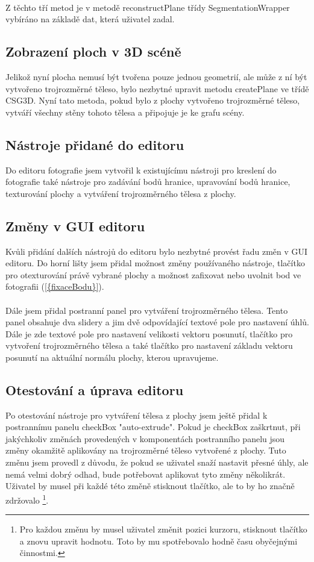 \documentclass[11pt,twoside,a4paper]{book}
\begin{document}
\paragraph{}
Z těchto tří metod je v metodě reconstructPlane třídy SegmentationWrapper vybíráno na základě dat, která uživatel zadal.

\subsection{Zobrazení ploch v 3D scéně}
Jelikož nyní plocha nemusí být tvořena pouze jednou geometrií, ale může z ní být vytvořeno trojrozměrné těleso, bylo nezbytné upravit metodu createPlane ve třídě CSG3D.  Nyní tato metoda, pokud bylo z plochy vytvořeno trojrozměrné těleso, vytváří všechny stěny tohoto tělesa a připojuje je ke grafu scény.

\subsection{Nástroje přidané do editoru}
Do editoru fotografie jsem vytvořil k existujícímu nástroji pro kreslení do fotografie také nástroje pro zadávání bodů hranice, upravování bodů hranice, texturování plochy a vytváření trojrozměrného tělesa z plochy.

\subsection{Změny v GUI editoru}
Kvůli přidání dalších nástrojů do editoru bylo nezbytné provést řadu změn v GUI editoru. Do horní lišty jsem přidal možnost změny používaného nástroje, tlačítko pro otexturování právě vybrané plochy a možnost zafixovat nebo uvolnit bod ve fotografii (\ref{{fixaceBodu}}). 
\paragraph{}
Dále jsem přidal postranní panel pro vytváření trojrozměrného tělesa. Tento panel obsahuje dva slidery a jim dvě odpovídající textové pole pro nastavení úhlů. Dále je zde textové pole pro nastavení velikosti vektoru posunutí, tlačítko pro vytvoření trojrozměrného tělesa a také tlačítko pro nastavení základu vektoru posunutí na aktuální normálu plochy, kterou upravujeme.  

\subsection{Otestování a úprava editoru}
Po otestování nástroje pro vytváření tělesa z plochy jsem ještě přidal k postrannímu panelu checkBox "auto-extrude". Pokud je checkBox zaškrtnut, při jakýchkoliv změnách provedených v komponentách postranního panelu jsou změny okamžitě aplikovány na trojrozměrné těleso vytvořené z plochy. Tuto změnu jsem provedl z důvodu, že pokud se uživatel snaží nastavit přesné úhly, ale nemá velmi dobrý odhad, bude potřebovat aplikovat tyto změny několikrát. Uživatel by musel při každé této změně stisknout tlačítko, ale to by ho značně zdržovalo \footnote{Pro každou změnu by musel uživatel změnit pozici kurzoru, stisknout tlačítko a znovu upravit hodnotu. Toto by mu spotřebovalo hodně času obyčejnými činnostmi.}.
\end{document}
